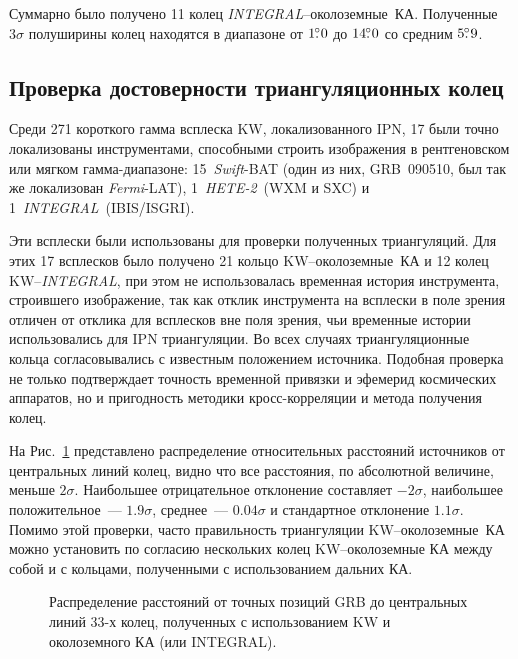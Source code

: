 Суммарно было получено 11 колец \textit{INTEGRAL}--околоземные~КА. Полученные $3\sigma$ 
полуширины колец находятся в диапазоне от $1\mbox{$.\!\!^\circ$}0$ до $14\mbox{$.\!\!^\circ$}0$ 
со средним $5\mbox{$.\!\!^\circ$}9$.

\subsection{Проверка достоверности триангуляционных колец}
Среди 271 короткого гамма всплеска KW, локализованного IPN, 17 были точно 
локализованы инструментами, способными строить изображения в рентгеновском или 
мягком гамма-диапазоне: 15~\textit{Swift}-BAT (один из них, GRB~090510, был 
так же локализован \textit{Fermi}-LAT), 1~\textit{HETE-2}~(WXM и SXC) и 1~\textit{INTEGRAL}~(IBIS/ISGRI).

Эти всплески были использованы для проверки полученных триангуляций. Для этих 17 всплесков 
было получено 21 кольцо KW--околоземные~КА и 12 колец KW--\textit{INTEGRAL}, 
при этом не использовалась временная история инструмента, строившего изображение, 
так как отклик инструмента на всплески в поле зрения отличен от отклика для всплесков 
вне поля зрения, чьи временные истории использовались для IPN триангуляции. 
Во всех случаях триангуляционные кольца согласовывались с известным положением источника. 
Подобная проверка не только подтверждает точность временной привязки и эфемерид космических
аппаратов, но и пригодность методики кросс-корреляции и метода получения колец.

На Рис.~\ref{img:dN_33_rel_offset} представлено распределение относительных расстояний источников 
от центральных линий колец, видно что все расстояния, по абсолютной величине, меньше $2\sigma$.
Наибольшее отрицательное отклонение составляет $-2\sigma$, 
наибольшее положительное~--- $1.9\sigma$, среднее~--- $0.04\sigma$ и стандартное отклонение $1.1\sigma$.
Помимо этой проверки, часто правильность триангуляции KW--околоземные~КА можно 
установить по согласию нескольких колец KW--околоземные КА между собой 
и с кольцами, полученными с использованием дальних КА.

\begin{figure}[h]
    \caption[Распределение расстояний от центра кольца до точного положения источника]
    {Распределение расстояний от точных позиций GRB до центральных линий 33-х колец, 
    полученных с использованием  KW и околоземного КА (или INTEGRAL).
    }
 \label{img:dN_33_rel_offset}  
\end{figure}

